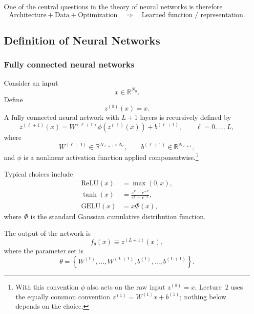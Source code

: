 One of the central questions in the theory of neural networks is therefore
\begin{equation}
    \boxed{
    \text{Architecture}
    +
    \text{Data}
    +
    \text{Optimization}
    \quad
    \Longrightarrow
    \quad
    \text{Learned function / representation}.
    }
\end{equation}


\subsection{Definition of Neural Networks}

\subsubsection{Fully connected neural networks}

Consider an input
\begin{equation}
    x\in\mathbb R^{N_0}.
\end{equation}
Define
\begin{equation}
    z^{(0)}(x)=x.
\end{equation}
A fully connected neural network with $L+1$ layers is recursively defined by
\begin{equation}
    z^{(\ell+1)}(x)
    =
    W^{(\ell+1)}
    \phi\!\left(z^{(\ell)}(x)\right)
    +
    b^{(\ell+1)},
    \qquad
    \ell=0,\ldots,L,
\end{equation}
where
\begin{equation}
    W^{(\ell+1)}
    \in
    \mathbb R^{N_{\ell+1}\times N_\ell},
    \qquad
    b^{(\ell+1)}
    \in
    \mathbb R^{N_{\ell+1}},
\end{equation}
and $\phi$ is a nonlinear activation function applied componentwise.\footnote{With
this convention $\phi$ also acts on the raw input $z^{(0)}=x$. Lecture~2 uses
the equally common convention $z^{(1)}=W^{(1)}x+b^{(1)}$; nothing below
depends on the choice.}

Typical choices include
\begin{align}
    \mathrm{ReLU}(x)&=\max(0,x),\\
    \tanh(x)&=\frac{e^x-e^{-x}}{e^x+e^{-x}},\\
    \mathrm{GELU}(x)&=x\Phi(x),
\end{align}
where $\Phi$ is the standard Gaussian cumulative distribution function.

The output of the network is
\begin{equation}
    f_\theta(x)
    \equiv
    z^{(L+1)}(x),
\end{equation}
where the parameter set is
\begin{equation}
    \theta
    =
    \left\{
    W^{(1)},\ldots,W^{(L+1)},
    b^{(1)},\ldots,b^{(L+1)}
    \right\}.
\end{equation}

